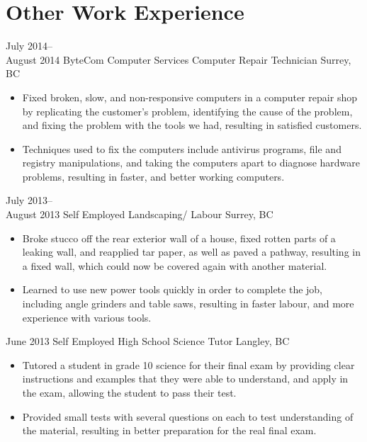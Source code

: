 \documentclass[]{friggeri-cv} %
\begin{document}
\section{Other Work Experience}

\begin{entrylist}

\entry
{July 2014--\\August 2014}
{ByteCom Computer Services {\normalfont Computer Repair Technician}}
{Surrey, BC}
{
\begin{itemize}
\item Fixed broken, slow, and non-responsive computers in a computer repair shop
by replicating the customer’s problem, identifying the cause of the problem, and
fixing the problem with the tools we had, resulting in satisfied customers.
\item Techniques used to fix the computers include antivirus programs, file and
registry manipulations, and taking the computers apart to diagnose hardware
problems, resulting in faster, and better working computers.
\end{itemize}
}

\entry
{July 2013--\\August 2013}
{Self Employed {\normalfont Landscaping/ Labour}}
{Surrey, BC}
{
\begin{itemize}
\item Broke stucco off the rear exterior wall of a house, fixed rotten parts of
a leaking wall, and reapplied tar paper, as well as paved a pathway, resulting
in a fixed wall, which could now be covered again with another material.
\item Learned to use new power tools quickly in order to complete the job,
including angle grinders and table saws, resulting in faster labour, and more
experience with various tools.
\end{itemize}
}
\entry
{June 2013}
{Self Employed {\normalfont High School Science Tutor}}
{Langley, BC}
{
\begin{itemize}
\item Tutored a student in grade 10 science for their final exam by providing
clear instructions and examples that they were able to understand, and apply in
the exam, allowing the student to pass their test.
\item Provided small tests with several questions on each to test understanding
of the material, resulting in better preparation for the real final exam.
\end{itemize}
}
\end{entrylist}
\end{document}
